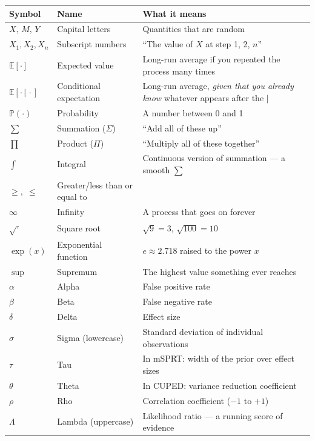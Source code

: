 \documentclass[12pt, a4paper]{article}
\newcommand{\E}{\mathbb{E}}            %
\newcommand{\Prob}{\mathbb{P}}         %
\newcommand{\given}{\,\vert\,}         %
\newcommand{\LR}{\Lambda}              %
\begin{document}
\begin{center}
\begin{tabular}{@{} l l p{8.5cm} @{}}
\toprule
\textbf{Symbol}       & \textbf{Name}                  & \textbf{What it means} \\
\midrule
$X,\,M,\,Y$          & Capital letters                & Quantities that are random \\
$X_1, X_2, X_n$      & Subscript numbers              & ``The value of $X$ at step 1, 2, $n$'' \\
$\E[\cdot]$           & Expected value                 & Long-run average if you repeated the process many times \\
$\E[\cdot \given \cdot]$ & Conditional expectation     & Long-run average, \emph{given that you already know} whatever appears after the $\vert$ \\
$\Prob(\cdot)$        & Probability                    & A number between 0 and 1 \\
$\displaystyle\sum$   & Summation ($\Sigma$)           & ``Add all of these up'' \\
$\displaystyle\prod$  & Product ($\Pi$)                & ``Multiply all of these together'' \\
$\displaystyle\int$   & Integral                       & Continuous version of summation --- a smooth $\sum$ \\
$\geq,\;\leq$        & Greater/less than or equal to   & \\
$\infty$              & Infinity                       & A process that goes on forever \\
$\sqrt{\cdot}$        & Square root                    & $\sqrt{9}=3$, $\sqrt{100}=10$ \\
$\exp(x)$            & Exponential function            & $e\approx 2.718$ raised to the power $x$ \\
$\sup$                & Supremum                       & The highest value something ever reaches \\
$\alpha$              & Alpha                          & False positive rate \\
$\beta$               & Beta                           & False negative rate \\
$\delta$              & Delta                          & Effect size \\
$\sigma$              & Sigma (lowercase)              & Standard deviation of individual observations \\
$\tau$                & Tau                            & In mSPRT: width of the prior over effect sizes \\
$\theta$              & Theta                          & In CUPED: variance reduction coefficient \\
$\rho$                & Rho                            & Correlation coefficient ($-1$ to $+1$) \\
$\LR$                 & Lambda (uppercase)             & Likelihood ratio --- a running score of evidence \\
\bottomrule
\end{tabular}
\end{center}
\end{document}
